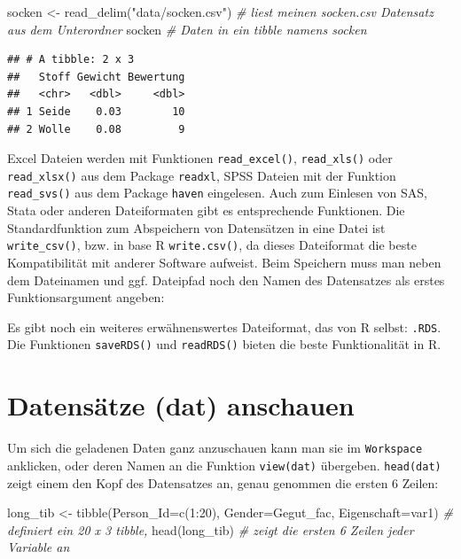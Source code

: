 \documentclass[
]{book}
\newenvironment{Shaded}{\begin{snugshade}}{\end{snugshade}}
\newcommand{\AttributeTok}[1]{\textcolor[rgb]{0.77,0.63,0.00}{#1}}
\newcommand{\CommentTok}[1]{\textcolor[rgb]{0.56,0.35,0.01}{\textit{#1}}}
\newcommand{\DecValTok}[1]{\textcolor[rgb]{0.00,0.00,0.81}{#1}}
\newcommand{\FunctionTok}[1]{\textcolor[rgb]{0.00,0.00,0.00}{#1}}
\newcommand{\NormalTok}[1]{#1}
\newcommand{\OtherTok}[1]{\textcolor[rgb]{0.56,0.35,0.01}{#1}}
\newcommand{\SpecialCharTok}[1]{\textcolor[rgb]{0.00,0.00,0.00}{#1}}
\newcommand{\StringTok}[1]{\textcolor[rgb]{0.31,0.60,0.02}{#1}}
\theoremstyle{definition}
\theoremstyle{definition}
\theoremstyle{definition}
\theoremstyle{definition}
\theoremstyle{remark}
\begin{document}
\begin{Shaded}
\begin{Highlighting}[]
\NormalTok{socken }\OtherTok{\textless{}{-}} \FunctionTok{read\_delim}\NormalTok{(}\StringTok{"data/socken.csv"}\NormalTok{) }\CommentTok{\# liest meinen socken.csv Datensatz aus dem Unterordner}
\NormalTok{socken                                  }\CommentTok{\# Daten in ein tibble namens socken}
\end{Highlighting}
\end{Shaded}

\begin{verbatim}
## # A tibble: 2 x 3
##   Stoff Gewicht Bewertung
##   <chr>   <dbl>     <dbl>
## 1 Seide    0.03        10
## 2 Wolle    0.08         9
\end{verbatim}

Excel Dateien werden mit Funktionen \texttt{read\_excel()}, \texttt{read\_xls()} oder \texttt{read\_xlsx()} aus dem Package \texttt{readxl}, SPSS Dateien mit der Funktion \texttt{read\_svs()} aus dem Package \texttt{haven} eingelesen. Auch zum Einlesen von SAS, Stata oder anderen Dateiformaten gibt es entsprechende Funktionen. Die Standardfunktion zum Abspeichern von Datensätzen in eine Datei ist \texttt{write\_csv()}, bzw. in base R \texttt{write.csv()}, da dieses Dateiformat die beste Kompatibilität mit anderer Software aufweist. Beim Speichern muss
man neben dem Dateinamen und ggf. Dateipfad noch den Namen des Datensatzes als erstes Funktionsargument angeben:

Es gibt noch ein weiteres erwähnenswertes Dateiformat, das von R selbst: \texttt{.RDS}. Die Funktionen \texttt{saveRDS()} und \texttt{readRDS()} bieten die beste Funktionalität in R.

\hypertarget{datensuxe4tze-dat-anschauen}{%
\section{Datensätze (dat) anschauen}\label{datensuxe4tze-dat-anschauen}}

Um sich die geladenen Daten ganz anzuschauen kann man sie im \texttt{Workspace} anklicken, oder deren Namen an die Funktion \texttt{view(dat)} übergeben. \texttt{head(dat)} zeigt einem den Kopf des Datensatzes an, genau genommen die ersten 6 Zeilen:

\begin{Shaded}
\begin{Highlighting}[]
\NormalTok{long\_tib }\OtherTok{\textless{}{-}} \FunctionTok{tibble}\NormalTok{(}\AttributeTok{Person\_Id=}\FunctionTok{c}\NormalTok{(}\DecValTok{1}\SpecialCharTok{:}\DecValTok{20}\NormalTok{), }
                   \AttributeTok{Gender=}\NormalTok{Gegut\_fac, }
                   \AttributeTok{Eigenschaft=}\NormalTok{var1)  }\CommentTok{\# definiert ein 20 x 3 tibble, }
\FunctionTok{head}\NormalTok{(long\_tib)                        }\CommentTok{\# zeigt die ersten 6 Zeilen jeder Variable an}
\end{Highlighting}
\end{Shaded}
\end{document}
